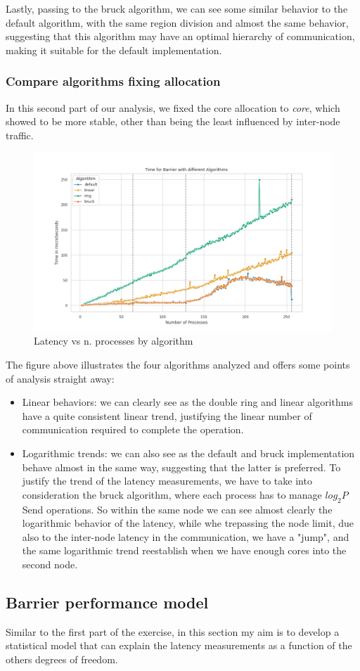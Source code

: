 \documentclass{article}
\begin{document}
	Lastly, passing to the bruck algorithm, we can see some similar behavior to the default algorithm, with the same region division and almost the same behavior, suggesting that this algorithm may have an optimal hierarchy of communication, making it suitable for the default implementation.
	
	\newpage
	
	\subsubsection{Compare algorithms fixing allocation}
	
	In this second part of our analysis, we fixed the core allocation to \textit{core}, which showed to be more stable, other than being the least influenced by inter-node traffic.
	
	
	\begin{figure}[h]
		\centering
		\includegraphics[width=0.9\linewidth]{../exercise1/plots/barrier_core}
		\caption{Latency vs n. processes by algorithm}
		\label{fig:barriercore}
	\end{figure}
	
	The figure above illustrates the four algorithms analyzed and offers some points of analysis straight away:
	
	\begin{itemize}
		\item Linear behaviors: we can clearly see as the double ring and linear algorithms have a quite consistent linear trend, justifying the linear number of communication required to complete the operation.
		\item Logarithmic trends: we can also see as the default and bruck implementation behave almost in the same way, suggesting that the latter is preferred. To justify the trend of the latency measurements, we have to take into consideration the bruck algorithm, where each process has to manage $log_2P$ Send operations. So within the same node we can see almost clearly the logarithmic behavior of the latency, while whe trepassing the node limit, due also to the inter-node latency in the communication, we have a "jump", and the same logarithmic trend reestablish when we have enough cores into the second node.
	\end{itemize}
	
	\subsection{Barrier performance model}
	
	Similar to the first part of the exercise, in this section my aim is to develop a statistical model that can explain the latency measurements as a function of the others degrees of freedom.
	
	 
\end{document}
